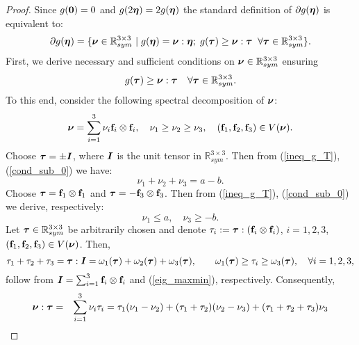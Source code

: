 \documentclass[a4paper,12pt]{article}
\theoremstyle{remark}
\newcommand{\mbf}[1]{\mbox{\boldmath$#1$}}
\numberwithin{equation}{section}
\begin{document}
\begin{proof}
Since $g(\mbf 0)=0$ and $g(2\mbf\eta)=2g(\mbf\eta)$ the standard definition of $\partial g(\mbf\eta)$ is equivalent to:
\begin{equation}
\partial g(\mbf\eta)=\{\mbf\nu\in\mathbb R^{3\times 3}_{sym}\ |\; g(\mbf\eta)=\mbf\nu:\mbf\eta;\; g(\mbf\tau)\geq\mbf\nu:\mbf\tau\;\;\forall \mbf\tau\in\mathbb R^{3\times 3}_{sym}\}.
\label{sub_def}
\end{equation}
First, we derive necessary and sufficient conditions on $\mbf\nu\in\mathbb R^{3\times 3}_{sym}$ ensuring
\begin{equation}
g(\mbf\tau)\geq\mbf\nu:\mbf\tau\quad \forall \mbf\tau\in\mathbb R^{3\times 3}_{sym}.
\label{ineq_g_T}
\end{equation}
To this end, consider the following spectral decomposition of $\mbf\nu$:
\begin{equation}
\mbf\nu=\sum_{i=1}^3\nu_i\mathbf f_i\otimes\mathbf f_i,\quad \nu_1\geq\nu_2\geq\nu_3,\quad (\mathbf f_1,\mathbf f_2,\mathbf f_3)\in V(\mbf\nu).
\label{cond_sub_0}
\end{equation}
Choose $\mbf\tau=\pm\mbf I$, where $\mbf I$ is the unit tensor in $\mathbb R^{3\times 3}_{sym}$. Then from (\ref{ineq_g_T}), (\ref{cond_sub_0}) we have:
\begin{equation}
\nu_1+\nu_2+\nu_3=a-b.
\label{cond_sub_1}
\end{equation}
Choose $\mbf\tau=\mathbf f_1\otimes\mathbf f_1$ and $\mbf\tau=-\mathbf f_3\otimes\mathbf f_3$.  Then from (\ref{ineq_g_T}), (\ref{cond_sub_0}) we derive, respectively:
\begin{equation}
\nu_1\leq a,\quad \nu_3\geq -b.
\label{cond_sub_2}
\end{equation}
Let $\mbf\tau\in\mathbb R^{3\times 3}_{sym}$ be arbitrarily chosen and denote $\tau_i:=\mbf\tau:(\mathbf f_i\otimes\mathbf f_i)$, $i=1,2,3$, $(\mathbf f_1,\mathbf f_2,\mathbf f_3)\in V(\mbf\nu)$. Then,
\begin{equation}
\tau_1+\tau_2+\tau_3=\mbf\tau:\mbf I=\omega_1(\mbf\tau)+\omega_2(\mbf\tau)+\omega_3(\mbf\tau),\qquad \omega_1(\mbf\tau)\geq\tau_i\geq\omega_3(\mbf\tau),\quad\forall i=1,2,3,
\label{tau_i_prop}
\end{equation}
follow from $\mbf I=\sum_{i=1}^3\mathbf f_i\otimes\mathbf f_i$ and (\ref{eig_maxmin}), respectively. Consequently,
\begin{eqnarray}
\mbf\nu:\mbf\tau&=&\sum_{i=1}^3\nu_i\tau_i=\tau_1(\nu_1- \nu_2)+(\tau_1+\tau_2)(\nu_2-\nu_3)+(\tau_1+\tau_2+\tau_3)\nu_3\nonumber\\

\end{eqnarray}
\end{proof}
\end{document}
